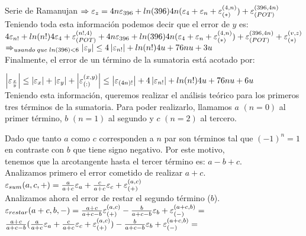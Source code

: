 \begin{subsection}{Serie de Ramanujan}
	$\Rightarrow \varepsilon _{z} = 4n\varepsilon _{396} + ln(396)4n(\varepsilon _{4} + \varepsilon _{n} + \varepsilon _{({*})}^{({4,n})}) + \varepsilon _{({POT})}^{({396,4n})}$\\
	
	Teniendo toda esta información podemos decir que el error de $y$ es:\\
	
	$4\varepsilon _{n!} + ln(n!) 4\varepsilon _{4} + \varepsilon _{({POT})}^{({n!,4})} + 4n\varepsilon _{396} + ln(396)4n(\varepsilon _{4} + \varepsilon _{n} + \varepsilon _{({*})}^{({4,n})}) + \varepsilon _{({POT})}^{({396,4n})} + \varepsilon _{({*})}^{({v,z})}$\\
	
	$\Rightarrow_{usando\;que\;ln(396)<6} \left|\varepsilon _{y}\right| \leq 4\left|\varepsilon _{n!}\right| + ln(n!)4u + 76nu + 3u$\\
	
	Finalmente, el error de un término de la sumatoria está acotado por:
	
	\pa

	$\left|\varepsilon _{\frac{x}{y}}\right| \leq \left|\varepsilon _{x}\right| + \left|\varepsilon _{y}\right| + \left|\varepsilon _{({:})}^{({x,y})}\right| \leq \left|\varepsilon _{(4n)!}\right| + 4\left|\varepsilon _{n!}\right| + ln(n!)4u + 76nu + 6u$\\
	
	Teniendo esta información, queremos realizar el análisis teórico para los primeros tres términos de la sumatoria. Para poder realizarlo, llamamos $a$ $(n=0)$ al primer término,
	$b$ $(n=1)$ al segundo y $c$ $(n=2)$ al tercero.
	
	Dado que tanto $a$ como $c$ corresponden a $n$ par son términos tal que $(-1)^n = 1$ en contraste con $b$ que tiene signo negativo. Por este motivo,\\
	tenemos que la arcotangente hasta el tercer término es: $a - b + c$.\\
	
	Analizamos primero el error cometido de realizar $a+c$.\\
	
	$\varepsilon _{sum}({a,c,+}) = \frac{a}{a+c}\varepsilon _{a} + \frac{c}{a+c}\varepsilon _{c} + \varepsilon _{({+})}^{({a,c})}$\\
	
	Analizamos ahora el error de restar el segundo término ($b$).\\
		
	$\varepsilon _{restar}({a+c,b,-}) = \frac{a+c}{a+c-b}\varepsilon _{({+})}^{({a,c})} - \frac{b}{a+c-b}\varepsilon _{b} + \varepsilon _{({-})}^{({a+c,b})} =$\\
	
	$\frac{a+c}{a+c-b}(\frac{a}{a+c}\varepsilon _{a} + \frac{c}{a+c}\varepsilon _{c} + \varepsilon _{({+})}^{({a,c})}) - \frac{b}{a+c-b}\varepsilon _{b} + \varepsilon _{({-})}^{({a+c,b})} =$\\
	

\end{subsection}
